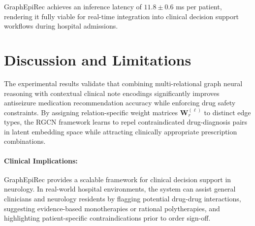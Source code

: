 \documentclass[11pt,a4paper]{article}
\begin{document}
\begin{table}[h]
\centering
\caption{\textbf{Computational Efficiency Benchmarking.} Training runtime, memory consumption, and per-patient inference latency on an NVIDIA A100 GPU.}
\label{tab:efficiency}
\small
{}
\end{table}

GraphEpiRec achieves an inference latency of $11.8 \pm 0.6$ ms per patient, rendering it fully viable for real-time integration into clinical decision support workflows during hospital admissions.

\section{Discussion and Limitations}

The experimental results validate that combining multi-relational graph neural reasoning with contextual clinical note encodings significantly improves antiseizure medication recommendation accuracy while enforcing drug safety constraints. By assigning relation-specific weight matrices $\mathbf{W}_r^{(\ell)}$ to distinct edge types, the RGCN framework learns to repel contraindicated drug-diagnosis pairs in latent embedding space while attracting clinically appropriate prescription combinations.

\paragraph{Clinical Implications:}
GraphEpiRec provides a scalable framework for clinical decision support in neurology. In real-world hospital environments, the system can assist general clinicians and neurology residents by flagging potential drug-drug interactions, suggesting evidence-based monotherapies or rational polytherapies, and highlighting patient-specific contraindications prior to order sign-off.
\end{document}
